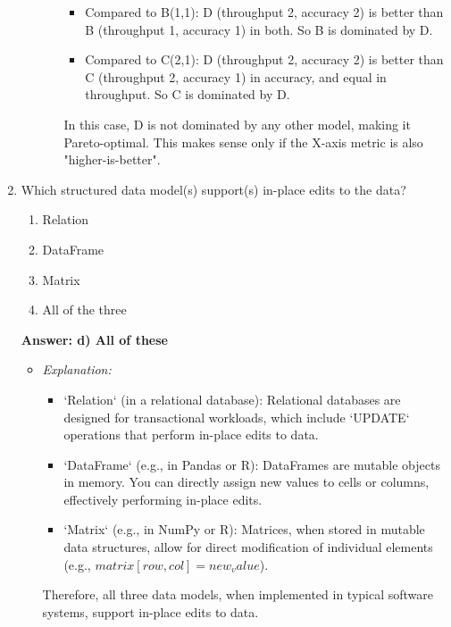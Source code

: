 \documentclass{article}
\begin{document}
\begin{enumerate}[label=\textbf{Question \arabic*.}]
\begin{itemize}
\begin{itemize}
\begin{itemize}
                    \item Compared to B(1,1): D (throughput 2, accuracy 2) is better than B (throughput 1, accuracy 1) in both. So B is dominated by D.
                    \item Compared to C(2,1): D (throughput 2, accuracy 2) is better than C (throughput 2, accuracy 1) in accuracy, and equal in throughput. So C is dominated by D.
                \end{itemize}
                In this case, D is not dominated by any other model, making it Pareto-optimal. This makes sense only if the X-axis metric is also "higher-is-better".
        \end{itemize}
    \end{itemize}

\item Which structured data model(s) support(s) in-place edits to the data?
    \begin{enumerate}[label=\alph*)]
        \item Relation
        \item DataFrame
        \item Matrix
        \item All of the three
    \end{enumerate}
    \textbf{Answer: d) All of these}
    \begin{itemize}
        \item \textit{Explanation:}
        \begin{itemize}
            \item `Relation` (in a relational database): Relational databases are designed for transactional workloads, which include `UPDATE` operations that perform in-place edits to data.
            \item `DataFrame` (e.g., in Pandas or R): DataFrames are mutable objects in memory. You can directly assign new values to cells or columns, effectively performing in-place edits.
            \item `Matrix` (e.g., in NumPy or R): Matrices, when stored in mutable data structures, allow for direct modification of individual elements (e.g., $matrix[row, col] = new_value$).
        \end{itemize}
        Therefore, all three data models, when implemented in typical software systems, support in-place edits to data.
    \end{itemize}


\end{enumerate}
\end{document}
